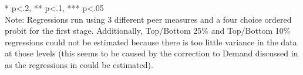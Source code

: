 \begin{sidewaystable}[htb]
\begin{threeparttable}
\begin{tabular}{l|c|c|c|c|c|c|c|c}
      \hline
      \hline
    \end{tabular}
    \begin{tablenotes}
    \item{* p<.2, ** p<.1, *** p<.05 \\Note: Regressions run using 3 different peer measures and a four choice ordered probit for the first stage. Additionally, Top/Bottom 25\% and Top/Bottom 10\% regressions could not be estimated because there is too little variance in the data at those levels (this seems to be caused by the correction to Demand discussed in  as the regressions in  could be estimated).}
    \end{tablenotes}
  \end{threeparttable}
\end{sidewaystable}

